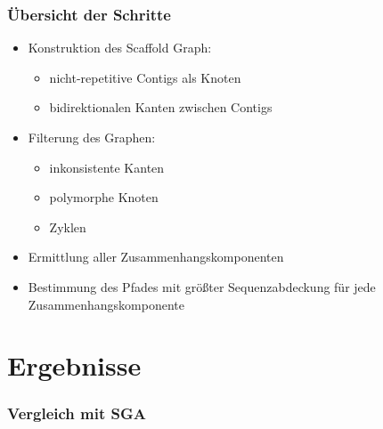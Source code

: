 \documentclass[xcolor=pst]{beamer}
\begin{document}
\begin{frame}
  \frametitle{Übersicht der Schritte}
  \begin{itemize}
  \item Konstruktion des Scaffold Graph:
    \begin{itemize}
    \item nicht-repetitive Contigs als Knoten
    \item bidirektionalen Kanten zwischen Contigs
    \end{itemize}
  \item Filterung des Graphen:
    \begin{itemize}
    \item inkonsistente Kanten
    \item polymorphe Knoten
    \item Zyklen
    \end{itemize}
  \item Ermittlung aller Zusammenhangskomponenten
  \item Bestimmung des Pfades mit größter Sequenzabdeckung für jede
    Zusammenhangskomponente
  \end{itemize}
\end{frame}

\section{Ergebnisse}
\begin{frame}
  \frametitle{Vergleich mit SGA}

\end{frame}
\end{document}
